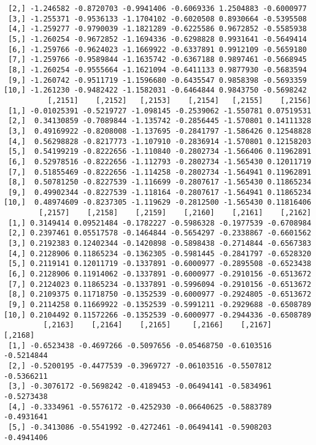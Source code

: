 \documentclass[
  letterpaper,
  DIV=11,
  numbers=noendperiod]{scrreprt}
\begin{document}
\begin{verbatim}
 [2,] -1.246582 -0.8720703 -0.9941406 -0.6069336 1.2504883 -0.6000977
 [3,] -1.255371 -0.9536133 -1.1704102 -0.6020508 0.8930664 -0.5395508
 [4,] -1.259277 -0.9790039 -1.1821289 -0.6225586 0.9672852 -0.5585938
 [5,] -1.260254 -0.9672852 -1.1694336 -0.6298828 0.9931641 -0.5649414
 [6,] -1.259766 -0.9624023 -1.1669922 -0.6337891 0.9912109 -0.5659180
 [7,] -1.259766 -0.9589844 -1.1635742 -0.6367188 0.9897461 -0.5668945
 [8,] -1.260254 -0.9555664 -1.1621094 -0.6411133 0.9877930 -0.5683594
 [9,] -1.260742 -0.9511719 -1.1596680 -0.6435547 0.9858398 -0.5693359
[10,] -1.261230 -0.9482422 -1.1582031 -0.6464844 0.9843750 -0.5698242
          [,2151]    [,2152]   [,2153]    [,2154]   [,2155]    [,2156]
 [1,] -0.01025391 -0.5219727 -1.098145 -0.2539062 -1.550781 0.07519531
 [2,]  0.34130859 -0.7089844 -1.135742 -0.2856445 -1.570801 0.14111328
 [3,]  0.49169922 -0.8208008 -1.137695 -0.2841797 -1.586426 0.12548828
 [4,]  0.56298828 -0.8217773 -1.107910 -0.2836914 -1.570801 0.12158203
 [5,]  0.54199219 -0.8222656 -1.110840 -0.2802734 -1.566406 0.11962891
 [6,]  0.52978516 -0.8222656 -1.112793 -0.2802734 -1.565430 0.12011719
 [7,]  0.51855469 -0.8222656 -1.114258 -0.2802734 -1.564941 0.11962891
 [8,]  0.50781250 -0.8227539 -1.116699 -0.2807617 -1.565430 0.11865234
 [9,]  0.49902344 -0.8227539 -1.118164 -0.2807617 -1.564941 0.11865234
[10,]  0.48974609 -0.8237305 -1.119629 -0.2812500 -1.565430 0.11816406
        [,2157]    [,2158]    [,2159]    [,2160]    [,2161]    [,2162]
 [1,] 0.3149414 0.09521484 -0.1782227 -0.5986328 -0.1977539 -0.6708984
 [2,] 0.2397461 0.05517578 -0.1464844 -0.5654297 -0.2338867 -0.6601562
 [3,] 0.2192383 0.12402344 -0.1420898 -0.5898438 -0.2714844 -0.6567383
 [4,] 0.2128906 0.11865234 -0.1362305 -0.5981445 -0.2841797 -0.6528320
 [5,] 0.2119141 0.12011719 -0.1337891 -0.6000977 -0.2895508 -0.6523438
 [6,] 0.2128906 0.11914062 -0.1337891 -0.6000977 -0.2910156 -0.6513672
 [7,] 0.2124023 0.11865234 -0.1337891 -0.5996094 -0.2910156 -0.6513672
 [8,] 0.2109375 0.11718750 -0.1352539 -0.6000977 -0.2924805 -0.6513672
 [9,] 0.2114258 0.11669922 -0.1352539 -0.5991211 -0.2929688 -0.6508789
[10,] 0.2104492 0.11572266 -0.1352539 -0.6000977 -0.2944336 -0.6508789
         [,2163]    [,2164]    [,2165]     [,2166]    [,2167]    [,2168]
 [1,] -0.6523438 -0.4697266 -0.5097656 -0.05468750 -0.6103516 -0.5214844
 [2,] -0.5200195 -0.4477539 -0.3969727 -0.06103516 -0.5507812 -0.5366211
 [3,] -0.3076172 -0.5698242 -0.4189453 -0.06494141 -0.5834961 -0.5273438
 [4,] -0.3334961 -0.5576172 -0.4252930 -0.06640625 -0.5883789 -0.4931641
 [5,] -0.3413086 -0.5541992 -0.4272461 -0.06494141 -0.5908203 -0.4941406

\end{verbatim}
\end{document}
